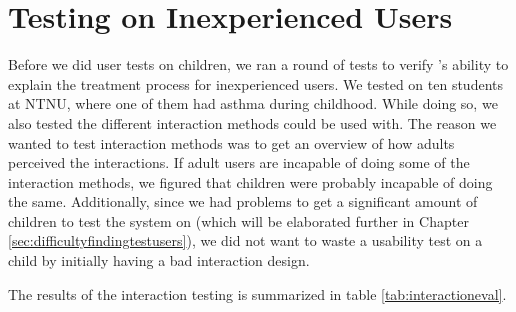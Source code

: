  

\section{Testing \ab{} on Inexperienced Users}
\label{chp:interaction-methods}

Before we did user tests on children, we ran a round of tests to verify \ab{}'s ability to explain the treatment process for inexperienced users. We tested on ten students at NTNU, where one of them had asthma during childhood. While doing so, we also tested the different interaction methods \ab{} could be used with. The reason we wanted to test interaction methods was to get an overview of how adults perceived the interactions. If adult users are incapable of doing some of the interaction methods, we figured that children were probably incapable of doing the same. Additionally, since we had problems to get a significant amount of children to test the system on (which will be elaborated further in Chapter \ref{sec:difficultyfindingtestusers}), we did not want to waste a usability test on a child by initially having a bad interaction design.         

The results of the interaction testing is summarized in table \ref{tab:interactioneval}.  

